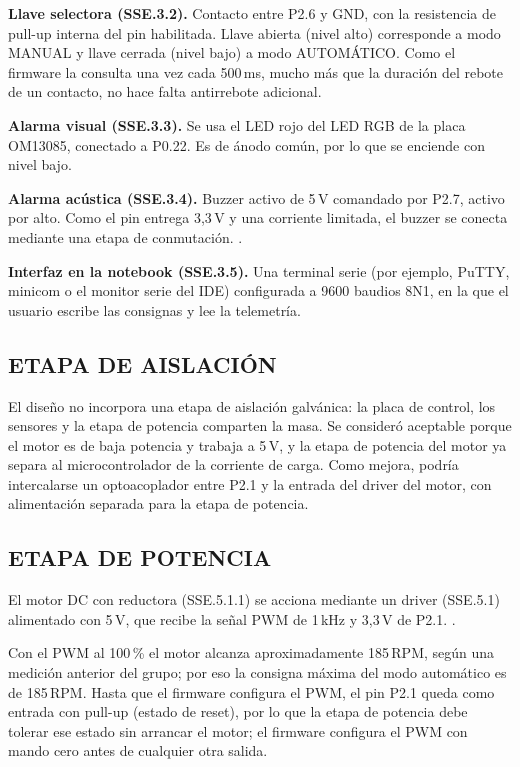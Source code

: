 \textbf{Llave selectora (SSE.3.2).} Contacto entre P2.6 y GND, con la resistencia de
pull-up interna del pin habilitada. Llave abierta (nivel alto) corresponde a modo MANUAL y
llave cerrada (nivel bajo) a modo AUTOMÁTICO. Como el firmware la consulta una vez cada
500\,ms, mucho más que la duración del rebote de un contacto, no hace falta antirrebote
adicional.

\textbf{Alarma visual (SSE.3.3).} Se usa el LED rojo del LED RGB de la placa OM13085,
conectado a P0.22. Es de ánodo común, por lo que se enciende con nivel bajo.

\textbf{Alarma acústica (SSE.3.4).} Buzzer activo de 5\,V comandado por P2.7, activo por
alto. Como el pin entrega 3,3\,V y una corriente limitada, el buzzer se conecta mediante
una etapa de conmutación. .

\textbf{Interfaz en la notebook (SSE.3.5).} Una terminal serie (por ejemplo, PuTTY,
minicom o el monitor serie del IDE) configurada a 9600 baudios 8N1, en la que el usuario
escribe las consignas y lee la telemetría.

\subsection{ETAPA DE AISLACIÓN}

El diseño no incorpora una etapa de aislación galvánica: la placa de control, los sensores
y la etapa de potencia comparten la masa. Se consideró aceptable porque el motor es de
baja potencia y trabaja a 5\,V, y la etapa de potencia del motor ya separa al
microcontrolador de la corriente de carga. Como mejora, podría intercalarse un
optoacoplador entre P2.1 y la entrada del driver del motor, con alimentación separada para
la etapa de potencia.

\subsection{ETAPA DE POTENCIA}

El motor DC con reductora (SSE.5.1.1) se acciona mediante un driver (SSE.5.1) alimentado
con 5\,V, que recibe la señal PWM de 1\,kHz y 3,3\,V de P2.1.
.

Con el PWM al 100\,\% el motor alcanza aproximadamente 185\,RPM, según una medición
anterior del grupo; por eso la consigna máxima del modo automático es de 185\,RPM. Hasta
que el firmware configura el PWM, el pin P2.1 queda como entrada con pull-up (estado de
reset), por lo que la etapa de potencia debe tolerar ese estado sin arrancar el motor; el
firmware configura el PWM con mando cero antes de cualquier otra salida.

